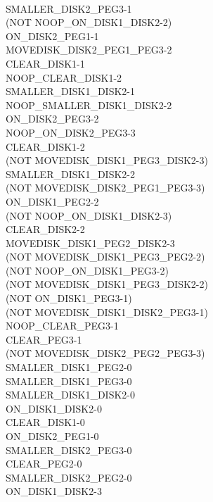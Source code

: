 \documentclass[12pt,letterpaper]{ntdhw}
\begin{document}
\begin{enumerate}
\begin{enumerate}
\\SMALLER\_DISK2\_PEG3\mbox{-}1
\\(NOT NOOP\_ON\_DISK1\_DISK2\mbox{-}2) 
\\ON\_DISK2\_PEG1\mbox{-}1 
\\MOVEDISK\_DISK2\_PEG1\_PEG3\mbox{-}2
\\CLEAR\_DISK1\mbox{-}1
\\NOOP\_CLEAR\_DISK1\mbox{-}2 
\\SMALLER\_DISK1\_DISK2\mbox{-}1
\\NOOP\_SMALLER\_DISK1\_DISK2\mbox{-}2 
\\ON\_DISK2\_PEG3\mbox{-}2 
\\NOOP\_ON\_DISK2\_PEG3\mbox{-}3 
\\CLEAR\_DISK1\mbox{-}2
\\(NOT MOVEDISK\_DISK1\_PEG3\_DISK2\mbox{-}3)
\\SMALLER\_DISK1\_DISK2\mbox{-}2
\\(NOT MOVEDISK\_DISK2\_PEG1\_PEG3\mbox{-}3) 
\\ON\_DISK1\_PEG2\mbox{-}2 
\\(NOT NOOP\_ON\_DISK1\_DISK2\mbox{-}3)
\\CLEAR\_DISK2\mbox{-}2 
\\MOVEDISK\_DISK1\_PEG2\_DISK2\mbox{-}3 
\\(NOT MOVEDISK\_DISK1\_PEG3\_PEG2\mbox{-}2)
\\(NOT NOOP\_ON\_DISK1\_PEG3\mbox{-}2) 
\\(NOT MOVEDISK\_DISK1\_PEG3\_DISK2\mbox{-}2)
\\(NOT ON\_DISK1\_PEG3\mbox{-}1) 
\\(NOT MOVEDISK\_DISK1\_DISK2\_PEG3\mbox{-}1) 
\\NOOP\_CLEAR\_PEG3\mbox{-}1
\\CLEAR\_PEG3\mbox{-}1 
\\(NOT MOVEDISK\_DISK2\_PEG2\_PEG3\mbox{-}3) 
\\SMALLER\_DISK1\_PEG2\mbox{-}0
\\SMALLER\_DISK1\_PEG3\mbox{-}0 
\\SMALLER\_DISK1\_DISK2\mbox{-}0 
\\ON\_DISK1\_DISK2\mbox{-}0 
\\CLEAR\_DISK1\mbox{-}0
\\ON\_DISK2\_PEG1\mbox{-}0 
\\SMALLER\_DISK2\_PEG3\mbox{-}0
\\CLEAR\_PEG2\mbox{-}0 
\\SMALLER\_DISK2\_PEG2\mbox{-}0
\\ON\_DISK1\_DISK2\mbox{-}3 

\end{enumerate}
\end{enumerate}
\end{document}
